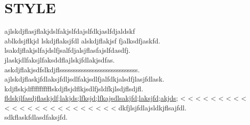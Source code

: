 \documentclass[11pt,oneside,a4paper]{article}
\begin{document}
\section{STYLE}
\indent\tiny ajlskdjflasjflakjdslfakjslfdajslfdkjaslfdjaldskf\\
\small ablkdsjflkjd lskdjflaksjfdl alskdjflakjsf fjalksdfjaskfd.\\
\footnotesize lsakdjflakjslfajdslfjsalfdjalsjflasfajslfdasdfj.\\
\normalsize jlaskjdlfaksjlfaksddflajlskjfdlakjsdfas.\\
\large askdjflakjsdfslkdjflsssssssssssssssssssssssssssss.\\
\Large ajlskdjflaskjfdlaksjfdljsdlfakjsdlfjalfdkjalsdfjlasjfdlask.\\
\huge kdjflskjdfffffffffflskdjflsjdflkjsdlfjsldfkjlsdjflsdjfl.\\
{\Huge \underline{fldskjlfasdjflaskjdf;lakjds;lfksjd;lfkajsdlsakjfd;laksjfd;akjds;}}
< < < < < < < < < < < < < < < < < < < < < < < <
dkfjlsjfdlajsldkjflsajfdl.\\
\normalsize \indent sdkflaskfdlasdfaksjfd.
\end{document}
